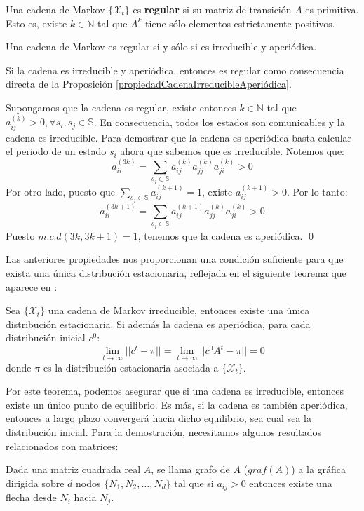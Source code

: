 \begin{definition}
Una cadena de Markov $\{\mathcal{X}_t\}$ es \textbf{regular} si su matriz de transición $A$ es primitiva. Esto es, existe $k\in\mathbb{N}$ tal que $A^k$ tiene sólo elementos estrictamente positivos.
\end{definition}

\begin{corollary}
    Una cadena de Markov es regular si y sólo si es irreducible y aperiódica.
\end{corollary}
\begin{proofs*}
Si la cadena es irreducible y aperiódica, entonces es regular como consecuencia directa de la Proposición \ref{propiedadCadenaIrreducibleAperiódica}.

Supongamos que la cadena es regular, existe entonces $k\in\mathbb{N}$ tal que $a_{ij}^{(k)}>0, \forall s_i,s_j\in\mathbb{S}$. En consecuencia, todos los estados son comunicables y la cadena es irreducible. Para demostrar que la cadena es aperiódica basta calcular el periodo de un estado $s_i$ ahora que sabemos que es irreducible. Notemos que:
\[a_{ii}^{(3k)}=\sum_{s_j\in\mathbb{S}}a_{ij}^{(k)} a_{jj}^{(k)} a_{ji}^{(k)}>0\]
Por otro lado, puesto que $\displaystyle\sum_{s_j\in\mathbb{S}}a_{ij}^{(k+1)}=1$, existe $a_{ij}^{(k+1)}>0$. Por lo tanto:
\[a_{ii}^{(3k+1)}=\sum_{s_j\in\mathbb{S}}a_{ij}^{(k+1)} a_{jj}^{(k)} a_{ji}^{(k)}>0\]
Puesto $m.c.d(3k,3k+1)=1$, tenemos que la cadena es aperiódica. \qed
\end{proofs*}


Las anteriores propiedades nos proporcionan una condición suficiente para que exista una única distribución estacionaria, reflejada en el siguiente teorema que aparece en \cite[Página 12]{JavierP}:
\begin{theorem}\label{ComportamientoAsintóticoMarkovIrreducible}
    Sea $\{\mathcal{X}_t\}$ una cadena de Markov irreducible, entonces existe una única distribución estacionaria. Si además la cadena es aperiódica, para cada distribución inicial $c^0$:
    \[\lim_{t\rightarrow\infty}||c^t-\pi||=\lim_{t\rightarrow\infty}||c^0A^t-\pi||=0\]
    donde $\pi$ es la distribución estacionaria asociada a $\{\mathcal{X}_t\}$.
\end{theorem}

Por este teorema, podemos asegurar que si una cadena es irreducible, entonces existe un único punto de equilibrio. Es más, si la cadena es también aperiódica, entonces a largo plazo convergerá hacia dicho equilibrio, sea cual sea la distribución inicial. Para la demostración, necesitamos algunos resultados relacionados con matrices:
\begin{definition}
Dada una matriz cuadrada real $A$, se llama grafo de $A$ ($graf(A)$) a la gráfica dirigida sobre $d$ nodos $\{N_1, N_2, \dots,N_d\}$ tal que si $a_{ij}>0$ entonces existe una flecha desde $N_i$ hacia $N_j$.
\end{definition}

